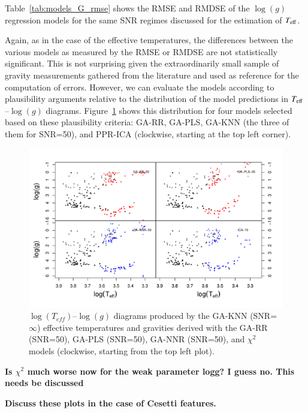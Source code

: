 Table~\ref{tab:models_G_rmse} shows the RMSE and RMDSE of the
$\log(g)$ regression models for the same SNR regimes discussed for the
estimation of $T_{\rm eff}$.

Again, as in the case of the effective temperatures, the differences
between the various models as measured by the RMSE or RMDSE are not
statistically significant.  This is not surprising given the
extraordinarily small sample of gravity measurements gathered from the
literature and used as reference for the computation of errors.
However, we can evaluate the models according to plausibility
arguments relative to the distribution of the model predictions in
$T_{\rm eff}$--$\log(g)$ diagrams.  Figure~\ref{fig:lt_lg_ga} shows
this distribution for four models selected based on these plausibility
criteria: GA-RR, GA-PLS, GA-KNN (the three of them for SNR=50), and
PPR-ICA (clockwise, starting at the top left corner).

\begin{figure}
 \begin{center}
   \includegraphics[width=\textwidth]{figs/ordieres-fig4.pdf}
 \caption{$\log(T_{eff})$--$\log(g)$ diagrams produced by the GA-KNN
   (SNR=$\infty$) effective temperatures and gravities derived with
   the GA-RR (SNR=50), GA-PLS (SNR=50), GA-NNR (SNR=50), and $\chi^2$ models (clockwise, starting from
   the top left plot).}
 \label{fig:lt_lg_ga}
 \end{center}
\end{figure}

{\bf Is $\chi^2$ much worse now for the weak parameter logg? I guess
  no. This needs be discussed}

{\bf Discuss these plots in the case of Cesetti features.}

